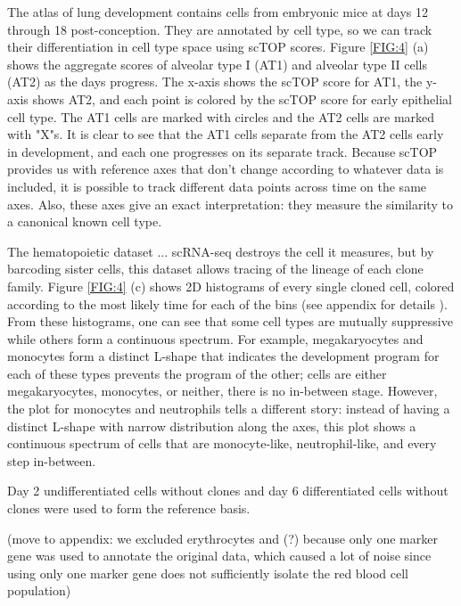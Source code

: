 \documentclass[aps,superscriptaddress, notitlepage,longbibliography]{revtex4-1}
\begin{document}
The atlas of lung development contains cells from  embryonic mice at days 12 through 18 post-conception. They are annotated by cell type, so we can track their differentiation in cell type space using scTOP scores. Figure \ref{FIG:4} (a) shows the aggregate scores of alveolar type I (AT1) and alveolar type II cells (AT2) as the days progress. The x-axis shows the scTOP score for AT1, the y-axis shows AT2, and each point is colored by the scTOP score for early epithelial cell type. The AT1 cells are marked with circles and the AT2 cells are marked with "X"s. It is clear to see that the AT1 cells separate from the AT2 cells early in development, and each one progresses on its separate track. Because scTOP provides us with reference axes that don't change according to whatever data is included, it is possible to track different data points across time on the same axes. Also, these axes give an exact interpretation: they measure the similarity to a canonical known cell type.

The hematopoietic dataset ...  scRNA-seq destroys the cell it measures, but by barcoding sister cells, this dataset allows tracing of the lineage of each clone family. Figure \ref{FIG:4} (c) shows 2D histograms of every single cloned cell, colored according to the most likely time for each of the bins (see appendix for details ). From these histograms, one can see that some cell types are mutually suppressive while others form a continuous spectrum. For example, megakaryocytes and monocytes form a distinct L-shape that indicates the development program for each of these types prevents the program of the other; cells are either megakaryocytes, monocytes, or neither, there is no in-between stage. However, the plot for monocytes and neutrophils tells a different story: instead of having a distinct L-shape with narrow distribution along the axes, this plot shows a continuous spectrum of cells that are monocyte-like, neutrophil-like, and every step in-between. 

Day 2 undifferentiated cells without clones and day 6 differentiated cells without clones were used to form the reference basis.

(move to appendix: we excluded erythrocytes and (?) because only one marker gene was used to annotate the original data, which caused a lot of noise since using only one marker gene does not sufficiently isolate the red blood cell population)
\end{document}

